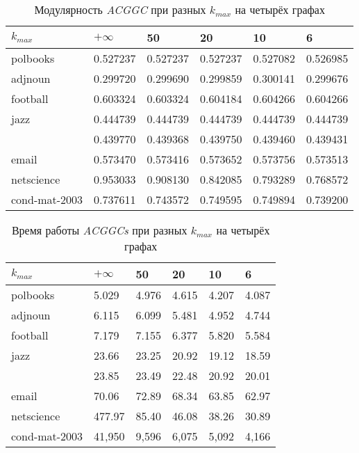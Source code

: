 \begin{table}[H]
 	\caption{Модулярность \emph{ACGGC} при разных $k_{max}$ на четырёх графах}
 	\label{tab:es-kmax-q}
 	\begin{tabularx}{\textwidth}{XR{1.5cm}R{1.5cm}R{1.5cm}R{1.5cm}R{1.5cm}}\hline
 		$k_{max}$		& $+\infty$	& 50		& 20		& 10		& 6 		\\\hline
 		polbooks		& 0.527237	& 0.527237	& 0.527237	& 0.527082	& 0.526985	\\
 		adjnoun			& 0.299720	& 0.299690	& 0.299859	& 0.300141	& 0.299676	\\
 		football		& 0.603324	& 0.603324	& 0.604184	& 0.604266	& 0.604266	\\
 		jazz			& 0.444739	& 0.444739	& 0.444739	& 0.444739	& 0.444739	\\
 		\celegans		& 0.439770	& 0.439368	& 0.439750	& 0.439460	& 0.439431	\\
 		email			& 0.573470	& 0.573416	& 0.573652	& 0.573756	& 0.573513	\\
 		netscience		& 0.953033	& 0.908130	& 0.842085	& 0.793289	& 0.768572	\\
 		cond-mat-2003	& 0.737611	& 0.743572	& 0.749595	& 0.749894	& 0.739200	\\\hline
 	\end{tabularx}
\end{table}

\begin{table}[H]
 	\caption{Время работы \emph{ACGGCs} при разных $k_{max}$ на четырёх графах}
 	\label{tab:es-kmax-t}
 	\begin{tabularx}{\textwidth}{XR{1.5cm}R{1.5cm}R{1.5cm}R{1.5cm}R{1.5cm}}\hline
 		$k_{max}$		& $+\infty$	& 50		& 20		& 10		& 6 		\\\hline
 		polbooks		& 5.029		& 4.976		& 4.615		& 4.207		& 4.087		\\
 		adjnoun			& 6.115		& 6.099		& 5.481		& 4.952		& 4.744		\\
 		football		& 7.179		& 7.155		& 6.377		& 5.820		& 5.584		\\
 		jazz			& 23.66		& 23.25		& 20.92		& 19.12		& 18.59		\\
 		\celegans		& 23.85		& 23.49		& 22.48		& 20.92		& 20.01		\\
 		email			& 70.06		& 72.89		& 68.34		& 63.85		& 62.97		\\
 		netscience		& 477.97	& 85.40		& 46.08		& 38.26		& 30.89		\\
 		cond-mat-2003	& 41,950	& 9,596		& 6,075		& 5,092		& 4,166		\\\hline
 	\end{tabularx}
\end{table}


